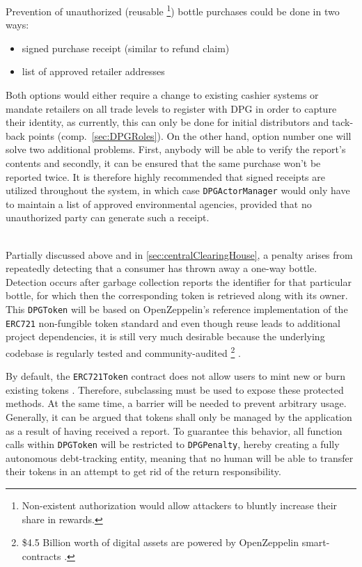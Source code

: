\begin{description}[format={\storedescriptionlabel}]
	Prevention of unauthorized (reusable \footnote{Non-existent authorization would allow attackers to bluntly increase their share in rewards.}) bottle purchases could be done in two ways:
	
	\begin{itemize}
  		\item signed purchase receipt (similar to refund claim)
  		\item list of approved retailer addresses
	\end{itemize}

	Both options would either require a change to existing cashier systems or mandate retailers on all trade levels to register with \ac{DPG} in order to capture their identity, as currently, this can only be done for initial distributors and tack-back points (comp.~\ref{sec:DPGRoles}). On the other hand, option number one will solve two additional problems. First, anybody will be able to verify the report's contents and secondly, it can be ensured that the same purchase won't be reported twice. It is therefore highly recommended that signed receipts are utilized throughout the system, in which case \texttt{DPGActorManager} would only have to maintain a list of approved environmental agencies, provided that no unauthorized party can generate such a receipt.
	
	\item[Penalty]
	\hfill \\
	Partially discussed above and in \autoref{sec:centralClearingHouse}, a penalty arises from repeatedly detecting that a consumer has thrown away a one-way bottle. Detection occurs after garbage collection reports the identifier for that particular bottle, for which then the corresponding token is retrieved along with its owner. This \texttt{DPGToken} will be based on OpenZeppelin's reference implementation of the \texttt{ERC721} non-fungible token standard and even though reuse leads to additional project dependencies, it is still very much desirable because the underlying codebase is regularly tested and community-audited \footnote{\$4.5 Billion worth of digital assets are powered by OpenZeppelin smart-contracts \cite{openZeppelin}.} \cite{openZeppelinGitHub}. 
	
	By default, the \texttt{ERC721Token} contract does not allow users to mint new or burn existing tokens \cite{}. Therefore, subclassing must be used to expose these protected methods. At the same time, a barrier will be needed to prevent arbitrary usage. Generally, it can be argued that tokens shall only be managed by the application as a result of having received a report. To guarantee this behavior, all function calls within \texttt{DPGToken} will be restricted to \texttt{DPGPenalty}, hereby creating a fully autonomous debt-tracking entity, meaning that no human will be able to transfer their tokens in an attempt to get rid of the return responsibility.
	

\end{description}
